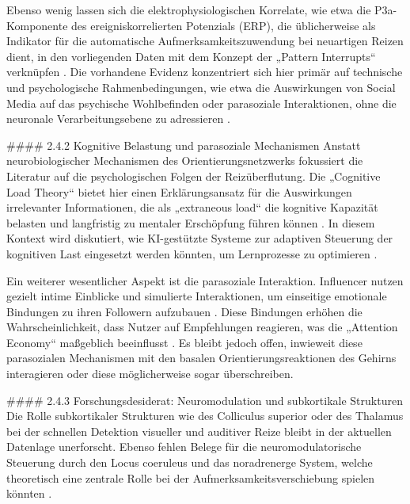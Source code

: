 \documentclass[11pt,a4paper]{article}
\begin{document}
Ebenso wenig lassen sich die elektrophysiologischen Korrelate, wie etwa die P3a-Komponente des ereigniskorrelierten Potenzials (ERP), die üblicherweise als Indikator für die automatische Aufmerksamkeitszuwendung bei neuartigen Reizen dient, in den vorliegenden Daten mit dem Konzept der „Pattern Interrupts“ verknüpfen \autocite{arxiv_1912_05975,arxiv_1912_05973,arxiv_1912_07514,arxiv_1912_05454}. Die vorhandene Evidenz konzentriert sich hier primär auf technische und psychologische Rahmenbedingungen, wie etwa die Auswirkungen von Social Media auf das psychische Wohlbefinden oder parasoziale Interaktionen, ohne die neuronale Verarbeitungsebene zu adressieren \autocite{grey_grey_5d5c282590c448fc8776b04f78a08de5,grey_grey_3467cac0f11d4b1e86319128da218a3e,grey_grey_f99abd6bfbd04efc8def60bb6988ce35,grey_grey_8407dc6841b0415a989fd351e0065df0}.

\#\#\#\# 2.4.2 Kognitive Belastung und parasoziale Mechanismen Anstatt neurobiologischer Mechanismen des Orientierungsnetzwerks fokussiert die Literatur auf die psychologischen Folgen der Reizüberflutung. Die „Cognitive Load Theory“ bietet hier einen Erklärungsansatz für die Auswirkungen irrelevanter Informationen, die als „extraneous load“ die kognitive Kapazität belasten und langfristig zu mentaler Erschöpfung führen können \autocite{grey_grey_d4bc9c0d0e8441ba90398520e73af07d}. In diesem Kontext wird diskutiert, wie KI-gestützte Systeme zur adaptiven Steuerung der kognitiven Last eingesetzt werden könnten, um Lernprozesse zu optimieren \autocite{grey_grey_b52a063f344f4bb6bb0b07a772233fbf}.

Ein weiterer wesentlicher Aspekt ist die parasoziale Interaktion. Influencer nutzen gezielt intime Einblicke und simulierte Interaktionen, um einseitige emotionale Bindungen zu ihren Followern aufzubauen \autocite{grey_grey_5d5c282590c448fc8776b04f78a08de5}. Diese Bindungen erhöhen die Wahrscheinlichkeit, dass Nutzer auf Empfehlungen reagieren, was die „Attention Economy“ maßgeblich beeinflusst \autocite{grey_grey_5d5c282590c448fc8776b04f78a08de5,grey_grey_c53300ebd6e148168e8f94b0598a1792}. Es bleibt jedoch offen, inwieweit diese parasozialen Mechanismen mit den basalen Orientierungsreaktionen des Gehirns interagieren oder diese möglicherweise sogar überschreiben.

\#\#\#\# 2.4.3 Forschungsdesiderat: Neuromodulation und subkortikale Strukturen Die Rolle subkortikaler Strukturen wie des Colliculus superior oder des Thalamus bei der schnellen Detektion visueller und auditiver Reize bleibt in der aktuellen Datenlage unerforscht. Ebenso fehlen Belege für die neuromodulatorische Steuerung durch den Locus coeruleus und das noradrenerge System, welche theoretisch eine zentrale Rolle bei der Aufmerksamkeitsverschiebung spielen könnten \autocite{arxiv_1912_05973,arxiv_1912_07514,arxiv_1912_05975,arxiv_1912_05454}.
\end{document}
